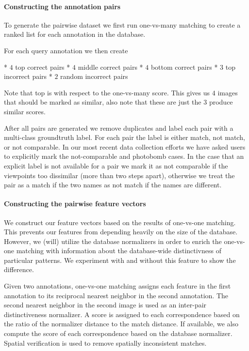 
\paragraph{Constructing the annotation pairs}

To generate the pairwise dataset we first run one-vs-many matching 
to create a ranked list for each annotation in the database.

For each query annotation we then create 

 * $4$ top correct pairs
 * $4$ middle correct pairs
 * $4$ bottom correct pairs
 * $3$ top incorrect pairs
 * $2$ random incorrect pairs

Note that top is with respect to the one-vs-many score.
This gives us $4$ images that should be marked as similar, also note that these are just the  $3$  produce similar scores. 


After all pairs are generated we remove duplicates and label each pair with a
  multi-class groundtruth label.
For each pair the label is either match, not match, or not comparable.
In our most recent data collection efforts we have asked users to explicitly
  mark the not-comparable and photobomb cases.
In the case that an explicit label is not available for a pair we mark it as
  not comparable if the viewpoints too dissimilar (more than two steps apart),
  otherwise we treat the pair as a match if the two names as not match if the
  names are different.

\paragraph{Constructing the pairwise feature vectors}

We construct our feature vectors based on the results of one-vs-one matching.
This prevents our features from depending heavily on the size of the database.
However, we (will) utilize the database normalizers in order to enrich the
  one-vs-one matching with information about the database-wide distinctivness of
  particular patterns.
We experiment with and without this feature to show the difference.

Given two annotations, one-vs-one matching assigns each feature in the first
  annotation to its reciprocal nearest neighbor in the second annotation.
The second nearest neighbor in the second image is used as an inter-pair
  distinctiveness normalizer.
A score is assigned to each correspondence based on the ratio of the
  normalizer distance to the match distance.
If available, we also compute the \LNBNN{} score of each correspondence based
  on the database normalizer.
Spatial verification is used to remove spatially inconsistent matches.

